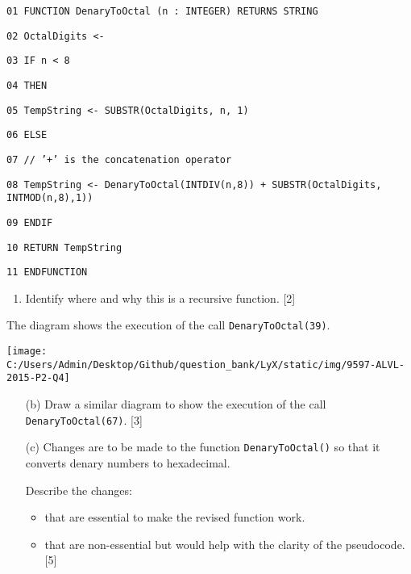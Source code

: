 \noindent %
\noindent\begin{minipage}[t]{1\columnwidth}%
\texttt{01 FUNCTION DenaryToOctal (n : INTEGER) RETURNS STRING }

\texttt{02 \qquad{}OctalDigits <- \textquotedbl{} }

\texttt{03 \qquad{}IF n < 8 }

\texttt{04 \qquad{}\qquad{}THEN }

\texttt{05 \qquad{}\qquad{}\qquad{}TempString <- SUBSTR(OctalDigits,
n, 1) }

\texttt{06 \qquad{}\qquad{}ELSE }

\texttt{07 \qquad{}\qquad{}\qquad{}// '+' is the concatenation
operator }

\texttt{08 \qquad{}\qquad{}\qquad{}TempString <- DenaryToOctal(INTDIV(n,8))
+ SUBSTR(OctalDigits, INTMOD(n,8),1)) }

\texttt{09 \qquad{}ENDIF }

\texttt{10 \qquad{}RETURN TempString }

\texttt{11 ENDFUNCTION }%
\end{minipage}
\begin{enumerate}
\item Identify where and why this is a recursive function. \hfill{}{[}2{]}
\end{enumerate}
The diagram shows the execution of the call \texttt{DenaryToOctal(39)}. 
\begin{center}
\texttt{[image: C:/Users/Admin/Desktop/Github/question\_bank/LyX/static/img/9597-ALVL-2015-P2-Q4]}
\par\end{center}
\begin{enumerate}
\item[(b)] Draw a similar diagram to show the execution of the call \texttt{DenaryToOctal(67)}.\hfill{}
{[}3{]}
\item[(c)] Changes are to be made to the function \texttt{DenaryToOctal()} so
that it converts denary numbers to hexadecimal.

Describe the changes: 
\begin{itemize}
\item that are essential to make the revised function work. 
\item that are non-essential but would help with the clarity of the pseudocode.\hfill{}
{[}5{]}
\end{itemize}
\end{enumerate}